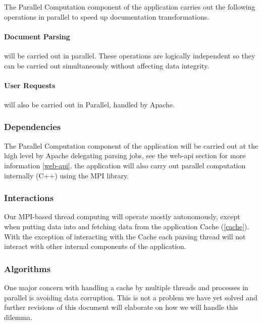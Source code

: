 \begin{enmerate}
The Parallel Computation component of the application carries out the following operations in parallel to speed up documentation transformations.

\paragraph{Document Parsing} will be carried out in parallel.
These operations are logically independent so they can be carried out simultaneously without affecting data integrity.

\paragraph{User Requests} will also be carried out in Parallel, handled by Apache.

\subsubsection{Dependencies}

The Parallel Computation component of the application will be carried out at the high level by Apache delegating parsing jobs, see the \gls{web-api} section for more information \ref{web-api}.
the application will also carry out parallel computation internally (C++) using the MPI library.

\subsubsection{Interactions}

Our MPI-based thread computing will operate mostly autonomously, except when putting data into and fetching data from the application Cache (\ref{cache}).
With the exception of interacting with the Cache each parsing thread will not interact with other internal components of the application.

\subsubsection{Algorithms}

One major concern with handling a cache by multiple threads and processes in parallel is avoiding data corruption.
This is not a problem we have yet solved and further revisions of this document will elaborate on how we will handle this dilemma.


\end{enmerate}
